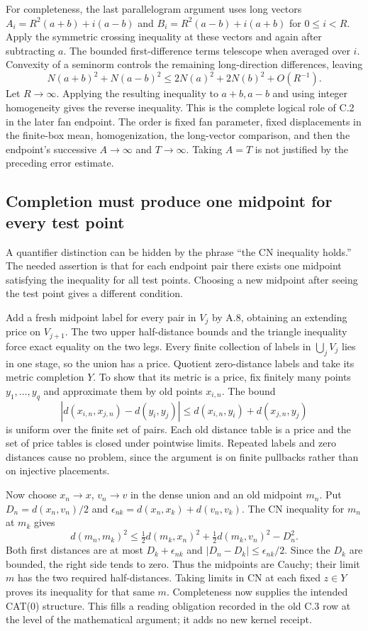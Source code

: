 \documentclass[11pt,letterpaper]{article}
\theoremstyle{definition}\newtheorem{definition}[theorem]{Definition}\newtheorem{example}[theorem]{Example}
\theoremstyle{remark}\newtheorem{remark}[theorem]{Remark}
\begin{document}
For completeness, the last parallelogram argument uses long vectors $A_i=R^2(a+b)+i(a-b)$ and $B_i=R^2(a-b)+i(a+b)$ for $0\le i<R$. Apply the symmetric crossing inequality at these vectors and again after subtracting $a$. The bounded first-difference terms telescope when averaged over $i$. Convexity of a seminorm controls the remaining long-direction differences, leaving
\[
 N(a+b)^2+N(a-b)^2\le 2N(a)^2+2N(b)^2+O(R^{-1}).
\]
Let $R\to\infty$. Applying the resulting inequality to $a+b,a-b$ and using integer homogeneity gives the reverse inequality. This is the complete logical role of C.2 in the later fan endpoint. The order is fixed fan parameter, fixed displacements in the finite-box mean, homogenization, the long-vector comparison, and then the endpoint's successive $A\to\infty$ and $T\to\infty$. Taking $A=T$ is not justified by the preceding error estimate.

\subsection{Completion must produce one midpoint for every test point}\label{sec:completiondetail}
A quantifier distinction can be hidden by the phrase ``the CN inequality holds.'' The needed assertion is that for each endpoint pair there exists one midpoint satisfying the inequality for all test points. Choosing a new midpoint after seeing the test point gives a different condition.

Add a fresh midpoint label for every pair in $V_j$ by A.8, obtaining an extending price on $V_{j+1}$. The two upper half-distance bounds and the triangle inequality force exact equality on the two legs. Every finite collection of labels in $\bigcup_jV_j$ lies in one stage, so the union has a price. Quotient zero-distance labels and take its metric completion $Y$. To show that its metric is a price, fix finitely many points $y_1,\ldots,y_q$ and approximate them by old points $x_{i,n}$. The bound
\[
 |d(x_{i,n},x_{j,n})-d(y_i,y_j)|\le d(x_{i,n},y_i)+d(x_{j,n},y_j)
\]
is uniform over the finite set of pairs. Each old distance table is a price and the set of price tables is closed under pointwise limits. Repeated labels and zero distances cause no problem, since the argument is on finite pullbacks rather than on injective placements.

Now choose $x_n\to x$, $v_n\to v$ in the dense union and an old midpoint $m_n$. Put $D_n=d(x_n,v_n)/2$ and $\epsilon_{nk}=d(x_n,x_k)+d(v_n,v_k)$. The CN inequality for $m_n$ at $m_k$ gives
\[
 d(m_n,m_k)^2\le \tfrac12d(m_k,x_n)^2+\tfrac12d(m_k,v_n)^2-D_n^2.
\]
Both first distances are at most $D_k+\epsilon_{nk}$ and $|D_n-D_k|\le\epsilon_{nk}/2$. Since the $D_k$ are bounded, the right side tends to zero. Thus the midpoints are Cauchy; their limit $m$ has the two required half-distances. Taking limits in CN at each fixed $z\in Y$ proves its inequality for that same $m$. Completeness now supplies the intended CAT(0) structure. This fills a reading obligation recorded in the old C.3 row at the level of the mathematical argument; it adds no new kernel receipt.
\end{document}
